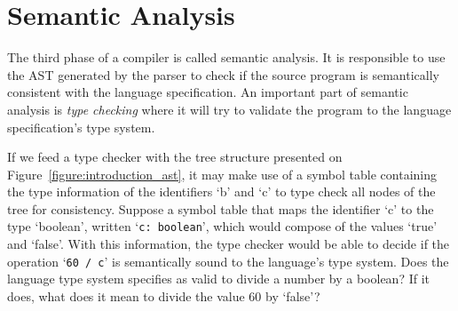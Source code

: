 \documentclass[
  oneside,
  english,
  coorientadorbanca,
  embeddedlogo,
  noabntexcite
]{ufsc-thesis-rn46-2019}
\newcommand{\bnfvar}[1]{\ \bnfvars{#1}}
\newcommand{\bnfvars}[1]{\texttt{#1}}
\newcommand{\bnfter}[1]{\ \bnfters{#1}}
\newcommand{\bnfters}[1]{\textrm{`}\texttt{#1}\textrm{'}}
\newcommand{\bnfprod}[2]{\bnfvars{#1} &\ &::= & #2}
\newcommand{\bnfmore}[1]{ && \mid{} & #1}
\begin{document}
\section{Semantic Analysis}\label{chapter:background:sec:semantic}

The third phase of a compiler is called semantic analysis.
It is responsible to use the AST generated by the parser to check if the source program is semantically consistent with the language specification.
An important part of semantic analysis is \textit{type checking} where it will try to validate the program to the language specification's type system.


If we feed a type checker with the tree structure presented on Figure~\ref{figure:introduction_ast}, it may make use of a symbol table containing the type information of the identifiers `b' and `c' to type check all nodes of the tree for consistency.
Suppose a symbol table that maps the identifier `c' to the type `boolean', written `\verb+c: boolean+', which would compose of the values `true' and `false'.
With this information, the type checker would be able to decide if the operation `\verb+60 / c+' is semantically sound to the language's type system.
Does the language type system specifies as valid to divide a number by a boolean?
If it does, what does it mean to divide the value 60 by `false'?
\end{document}
